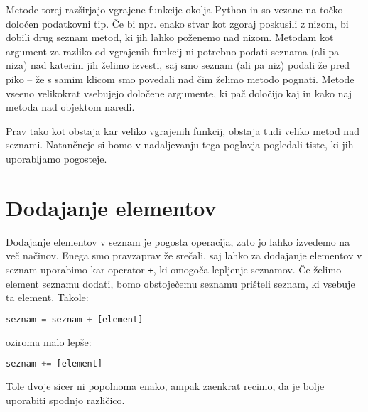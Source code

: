Metode torej razširjajo vgrajene funkcije okolja Python in so vezane na točko določen podatkovni tip. Če bi npr. enako stvar kot zgoraj poskusili z nizom, bi dobili drug seznam metod, ki jih lahko poženemo nad nizom. Metodam kot argument za razliko od vgrajenih funkcij ni potrebno podati seznama (ali pa niza) nad katerim jih želimo izvesti, saj smo seznam (ali pa niz) podali že pred piko -- že s samim klicom smo povedali nad čim želimo metodo pognati. Metode vseeno velikokrat vsebujejo določene argumente, ki pač določijo kaj in kako naj metoda nad objektom naredi. 

Prav tako kot obstaja kar veliko vgrajenih funkcij, obstaja tudi veliko metod nad seznami. Natančneje si bomo v nadaljevanju tega poglavja pogledali tiste, ki jih uporabljamo pogosteje.

\section{Dodajanje elementov}

Dodajanje elementov v seznam je pogosta operacija, zato jo lahko izvedemo na več načinov. Enega smo pravzaprav že srečali, saj lahko za dodajanje elementov v seznam uporabimo kar operator \texttt{+}, ki omogoča lepljenje seznamov. Če želimo element seznamu dodati, bomo obstoječemu seznamu prišteli seznam, ki vsebuje ta element. Takole:
\begin{lstlisting}[language=Python, showstringspaces=false]
seznam = seznam + [element]
\end{lstlisting}
oziroma malo lepše:
\begin{lstlisting}[language=Python, showstringspaces=false]
seznam += [element]
\end{lstlisting}
Tole dvoje sicer ni popolnoma enako, ampak zaenkrat recimo, da je bolje uporabiti spodnjo različico. 

